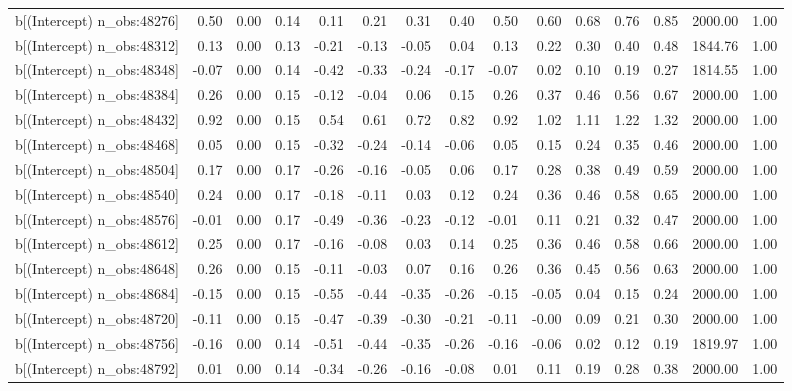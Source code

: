 \begin{table}[ht]
\begin{tabular}{rrrrrrrrrrrrrrr}
  b[(Intercept) n\_obs:48276] & 0.50 & 0.00 & 0.14 & 0.11 & 0.21 & 0.31 & 0.40 & 0.50 & 0.60 & 0.68 & 0.76 & 0.85 & 2000.00 & 1.00 \\ 
  b[(Intercept) n\_obs:48312] & 0.13 & 0.00 & 0.13 & -0.21 & -0.13 & -0.05 & 0.04 & 0.13 & 0.22 & 0.30 & 0.40 & 0.48 & 1844.76 & 1.00 \\ 
  b[(Intercept) n\_obs:48348] & -0.07 & 0.00 & 0.14 & -0.42 & -0.33 & -0.24 & -0.17 & -0.07 & 0.02 & 0.10 & 0.19 & 0.27 & 1814.55 & 1.00 \\ 
  b[(Intercept) n\_obs:48384] & 0.26 & 0.00 & 0.15 & -0.12 & -0.04 & 0.06 & 0.15 & 0.26 & 0.37 & 0.46 & 0.56 & 0.67 & 2000.00 & 1.00 \\ 
  b[(Intercept) n\_obs:48432] & 0.92 & 0.00 & 0.15 & 0.54 & 0.61 & 0.72 & 0.82 & 0.92 & 1.02 & 1.11 & 1.22 & 1.32 & 2000.00 & 1.00 \\ 
  b[(Intercept) n\_obs:48468] & 0.05 & 0.00 & 0.15 & -0.32 & -0.24 & -0.14 & -0.06 & 0.05 & 0.15 & 0.24 & 0.35 & 0.46 & 2000.00 & 1.00 \\ 
  b[(Intercept) n\_obs:48504] & 0.17 & 0.00 & 0.17 & -0.26 & -0.16 & -0.05 & 0.06 & 0.17 & 0.28 & 0.38 & 0.49 & 0.59 & 2000.00 & 1.00 \\ 
  b[(Intercept) n\_obs:48540] & 0.24 & 0.00 & 0.17 & -0.18 & -0.11 & 0.03 & 0.12 & 0.24 & 0.36 & 0.46 & 0.58 & 0.65 & 2000.00 & 1.00 \\ 
  b[(Intercept) n\_obs:48576] & -0.01 & 0.00 & 0.17 & -0.49 & -0.36 & -0.23 & -0.12 & -0.01 & 0.11 & 0.21 & 0.32 & 0.47 & 2000.00 & 1.00 \\ 
  b[(Intercept) n\_obs:48612] & 0.25 & 0.00 & 0.17 & -0.16 & -0.08 & 0.03 & 0.14 & 0.25 & 0.36 & 0.46 & 0.58 & 0.66 & 2000.00 & 1.00 \\ 
  b[(Intercept) n\_obs:48648] & 0.26 & 0.00 & 0.15 & -0.11 & -0.03 & 0.07 & 0.16 & 0.26 & 0.36 & 0.45 & 0.56 & 0.63 & 2000.00 & 1.00 \\ 
  b[(Intercept) n\_obs:48684] & -0.15 & 0.00 & 0.15 & -0.55 & -0.44 & -0.35 & -0.26 & -0.15 & -0.05 & 0.04 & 0.15 & 0.24 & 2000.00 & 1.00 \\ 
  b[(Intercept) n\_obs:48720] & -0.11 & 0.00 & 0.15 & -0.47 & -0.39 & -0.30 & -0.21 & -0.11 & -0.00 & 0.09 & 0.21 & 0.30 & 2000.00 & 1.00 \\ 
  b[(Intercept) n\_obs:48756] & -0.16 & 0.00 & 0.14 & -0.51 & -0.44 & -0.35 & -0.26 & -0.16 & -0.06 & 0.02 & 0.12 & 0.19 & 1819.97 & 1.00 \\ 
  b[(Intercept) n\_obs:48792] & 0.01 & 0.00 & 0.14 & -0.34 & -0.26 & -0.16 & -0.08 & 0.01 & 0.11 & 0.19 & 0.28 & 0.38 & 2000.00 & 1.00 \\ 

\end{tabular}
\end{table}
